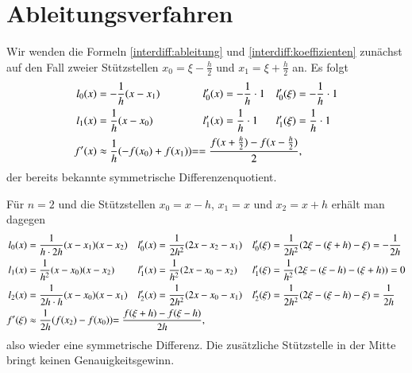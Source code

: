 \section{Ableitungsverfahren
\label{section:interdiff:ableitung}}
Wir wenden die Formeln
\eqref{interdiff:ableitung}
und
\eqref{interdiff:koeffizienten}
zunächst auf den Fall zweier Stützstellen $x_0=\xi-\frac{h}2$ und
$x_1=\xi+\frac{h}2$ an.
Es folgt
\begin{align*}
l_0(x)
&=
-\frac{1}{h} (x-x_1)
&
l_0'(x)
&=
-\frac1h \cdot 1
&
l_0'(\xi)
&=
-\frac1h \cdot 1
\\
l_1(x)
&=
\frac1{h} (x-x_0)
&
l_1'(x)
&=
\frac1h \cdot 1
&
l_1'(\xi)
&=
\frac1h \cdot 1
\\
f'(x)
&\approx
\frac1h(- f(x_0)+f(x_1))
\rlap{$\displaystyle=
= \frac{f(x+\frac{h}2)-f(x-\frac{h}2)}{2},$}
\end{align*}
der bereits bekannte symmetrische Differenzenquotient.

Für $n=2$ und die Stützstellen $x_0=x-h$, $x_1=x$ und $x_2=x+h$ erhält man
dagegen
\begin{align*}
l_0(x)
&=
\frac{1}{h\cdot 2h} (x-x_1)(x-x_2)
&
l_0'(x)
&=
\frac{1}{2h^2}(2x-x_2-x_1)
&
l_0'(\xi)
&=
\frac{1}{2h^2}(2\xi -(\xi+h) -\xi)
=
-\frac{1}{2h}
\\
l_1(x)
&=
\frac{1}{h^2} (x-x_0)(x-x_2)
&
l'_1(x)
&=
\frac{1}{h^2} (2x-x_0-x_2)
&
l'_1(\xi)
&=
\frac{1}{h^2}(2\xi-(\xi-h)-(\xi+h)) = 0
\\
l_2(x)
&=
\frac{1}{2h\cdot h} (x-x_0)(x-x_1)
&
l'_2(x)
&=
\frac{1}{2h^2} (2x-x_0-x_1)
&
l'_2(\xi)
&=
\frac{1}{2h^2} (2\xi-(\xi-h)-\xi)
=
\frac{1}{2h}
\\
f'(\xi)
&\approx
\frac{1}{2h}(f(x_2) - f(x_0))
\rlap{$\displaystyle= \frac{f(\xi+h)-f(\xi-h)}{2h},$}
\end{align*}
also wieder eine symmetrische Differenz.
Die zusätzliche Stützstelle in der Mitte bringt keinen Genauigkeitsgewinn.

